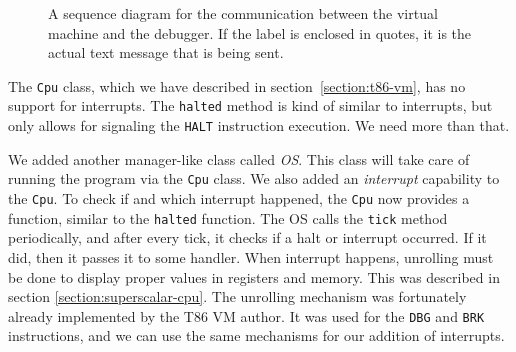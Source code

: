 \begin{figure}
    \centering
    \scalebox{0.8} {
    }
    \caption{A sequence diagram for the communication between the virtual
    machine and the debugger. If the label is enclosed in quotes, it is the
    actual text message that is being sent.} \label{fig:dbg-vm-seq}
\end{figure}

The \texttt{Cpu} class, which we have described in section~\ref{section:t86-vm},
has no support for interrupts. The \texttt{halted} method is kind of similar
to interrupts, but only allows for signaling the \texttt{HALT} instruction
execution. We need more than that.

We added another manager-like class called \textit{OS}. This class will take
care of running the program via the \texttt{Cpu} class. We also added an
\textit{interrupt} capability to the \texttt{Cpu}. To check if and which
interrupt happened, the \texttt{Cpu} now provides a function, similar to the
\texttt{halted} function. The OS calls the \texttt{tick} method periodically,
and after every tick, it checks if a halt or interrupt occurred. If it did,
then it passes it to some handler. When interrupt happens, unrolling must be
done to display proper values in registers and memory. This was described in
section \ref{section:superscalar-cpu}. The unrolling mechanism was fortunately
already implemented by the T86 VM author. It was used for the \texttt{DBG} and
\texttt{BRK} instructions, and we can use the same mechanisms for our addition
of interrupts.

